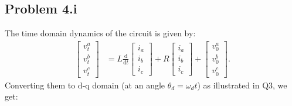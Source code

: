 \subsection*{Problem 4.i}
The time domain dynamics of the circuit is given by:
\begin{align*}
	\begin{bmatrix}
		v_t^a\\v_t^b\\v_t^c
	\end{bmatrix} &= L \frac{\text{d}}{\text{d}t}\begin{bmatrix}
		i_a\\i_b\\i_c
	\end{bmatrix} + R \begin{bmatrix}
		i_a\\i_b\\i_c
	\end{bmatrix}+\begin{bmatrix}
		v_0^a\\v_0^b\\v_0^c
	\end{bmatrix}.
\end{align*}
Converting them to d-q domain (at an angle $\theta_d=\omega_d t$) as illustrated in Q3, we get:
